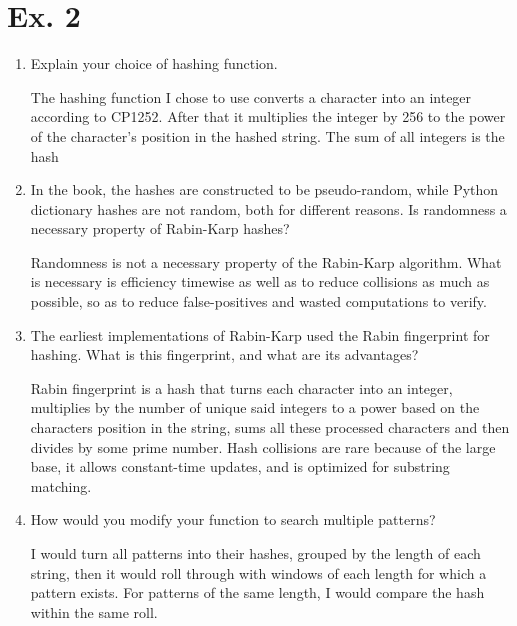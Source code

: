 \documentclass{article}
\begin{document}
\section{Ex. 2}
\begin{enumerate}
    \item Explain your choice of hashing function.  
    
    The hashing function I chose to use converts a character into an integer according to CP1252. After that it multiplies the integer by 256 to the power of the character's position in the hashed string. The sum of all integers is the hash
    
    \item In the book, the hashes are constructed to be pseudo-random, while Python dictionary hashes are not random, both for different reasons. Is randomness a necessary property of Rabin-Karp hashes?
    
    Randomness is not a necessary property of the Rabin-Karp algorithm. What is necessary is efficiency timewise as well as to reduce collisions as much as possible, so as to reduce false-positives and wasted computations to verify.
    
    \item The earliest implementations of Rabin-Karp used the Rabin fingerprint for hashing. What is this fingerprint, and what are its advantages?
    
    Rabin fingerprint is a hash that turns each character into an integer, multiplies by the number of unique said integers to a power based on the characters position in the string, sums all these processed characters and then divides by some prime number. Hash collisions are rare because of the large base, it allows constant-time updates, and is optimized for substring matching.
    
    \item How would you modify your function to search multiple patterns? 

    I would turn all patterns into their hashes, grouped by the length of each string, then it would roll through with windows of each length for which a pattern exists. For patterns of the same length, I would compare the hash within the same roll.

\end{enumerate}
\end{document}

